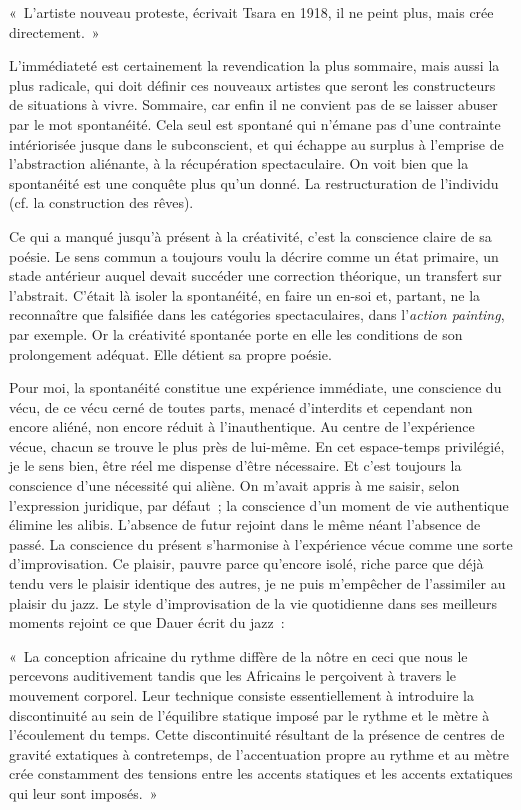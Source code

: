 \documentclass[french,twoside]{book} %
\newenvironment{quoteblock}%
  {\begin{quoting}}
  {\end{quoting}}
\newenvironment{quotebar}{%
    \def\FrameCommand{{\color{rubric!10!}\vrule width 0.5em} \hspace{0.9em}}%
    \def\OuterFrameSep{\itemsep} %
    \MakeFramed {\advance\hsize-\width \FrameRestore}
  }%
  {%
    \endMakeFramed
  }
\renewenvironment{quoteblock}%
  {%
    \savenotes
    \setstretch{0.9}
    \normalfont
    \begin{quotebar}
  }
  {%
    \end{quotebar}
    \spewnotes
  }
\begin{document}
\begin{quoteblock}
\noindent « L’artiste nouveau proteste, écrivait Tsara en 1918, il ne peint plus, mais crée directement. »\end{quoteblock}

\noindent L’immédiateté est certainement la revendication la plus sommaire, mais aussi la plus radicale, qui doit définir ces nouveaux artistes que seront les constructeurs de situations à vivre. Sommaire, car enfin il ne convient pas de se laisser abuser par le mot spontanéité. Cela seul est spontané qui n’émane pas d’une contrainte intériorisée jusque dans le subconscient, et qui échappe au surplus à l’emprise de l’abstraction aliénante, à la récupération spectaculaire. On voit bien que la spontanéité est une conquête plus qu’un donné. La restructuration de l’individu (cf. la construction des rêves).\par
Ce qui a manqué jusqu’à présent à la créativité, c’est la conscience claire de sa poésie. Le sens commun a toujours voulu la décrire comme un état primaire, un stade antérieur auquel devait succéder une correction théorique, un transfert sur l’abstrait. C’était là isoler la spontanéité, en faire un en-soi et, partant, ne la reconnaître que falsifiée dans les catégories spectaculaires, dans l’\emph{action painting}, par exemple. Or la créativité spontanée porte en elle les conditions de son prolongement adéquat. Elle détient sa propre poésie.\par
Pour moi, la spontanéité constitue une expérience immédiate, une conscience du vécu, de ce vécu cerné de toutes parts, menacé d’interdits et cependant non encore aliéné, non encore réduit à l’inauthentique. Au centre de l’expérience vécue, chacun se trouve le plus près de lui-même. En cet espace-temps privilégié, je le sens bien, être réel me dispense d’être nécessaire. Et c’est toujours la conscience d’une nécessité qui aliène. On m’avait appris à me saisir, selon l’expression juridique, par défaut ; la conscience d’un moment de vie authentique élimine les alibis. L’absence de futur rejoint dans le même néant l’absence de passé. La conscience du présent s’harmonise à l’expérience vécue comme une sorte d’improvisation. Ce plaisir, pauvre parce qu’encore isolé, riche parce que déjà tendu vers le plaisir identique des autres, je ne puis m’empêcher de l’assimiler au plaisir du jazz. Le style d’improvisation de la vie quotidienne dans ses meilleurs moments rejoint ce que Dauer écrit du jazz :\par

\begin{quoteblock}
\noindent « La conception africaine du rythme diffère de la nôtre en ceci que nous le percevons auditivement tandis que les Africains le perçoivent à travers le mouvement corporel. Leur technique consiste essentiellement à introduire la discontinuité au sein de l’équilibre statique imposé par le rythme et le mètre à l’écoulement du temps. Cette discontinuité résultant de la présence de centres de gravité extatiques à contretemps, de l’accentuation propre au rythme et au mètre crée constamment des tensions entre les accents statiques et les accents extatiques qui leur sont imposés. »\end{quoteblock}
\end{document}
